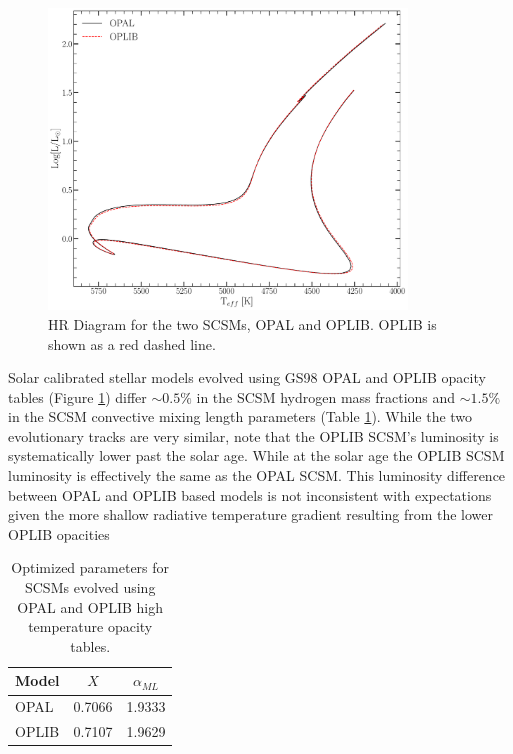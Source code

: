 \begin{figure}
	\centering
	\includegraphics[width=0.85\textwidth]{figures/jaoOpacity/HRDiagramOPALvsOPLIB_SCCM.pdf}
	\caption{HR Diagram for the two SCSMs, OPAL and OPLIB. OPLIB is shown as a red
	dashed line.}
	\label{fig:OPLIBOPALHR}
\end{figure}

Solar calibrated stellar models evolved using GS98 OPAL and OPLIB opacity
tables (Figure \ref{fig:OPLIBOPALHR}) differ $\sim 0.5\%$ in the SCSM hydrogen
mass fractions and $\sim 1.5\%$ in the SCSM convective mixing length parameters
(Table \ref{tab:SCSMResults}). While the two evolutionary tracks are very
similar, note that the OPLIB SCSM's luminosity is systematically lower past the
solar age. While at the solar age the OPLIB SCSM luminosity is effectively the
same as the OPAL SCSM. This luminosity difference between OPAL and OPLIB based
models is not inconsistent with expectations given the more shallow radiative
temperature gradient resulting from the lower OPLIB opacities

\begin{table}
	\centering
	\begin{tabular}{l c c}
		\hline
		Model & $X$ & $\alpha_{ML}$ \\
		\hline
		\hline
		OPAL & 0.7066 & 1.9333 \\
		OPLIB & 0.7107 & 1.9629
	\end{tabular}
	\caption{Optimized parameters for SCSMs evolved using OPAL and OPLIB high
	temperature opacity tables.}
	\label{tab:SCSMResults}
\end{table}


